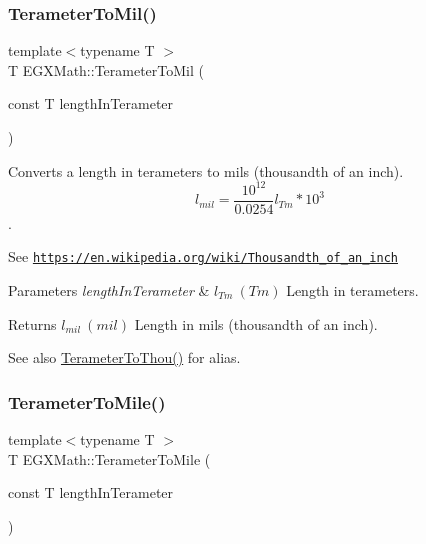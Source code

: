 \subsubsection{\texorpdfstring{Terameter\+To\+Mil()}{TerameterToMil()}}
{\footnotesize\ttfamily template$<$typename T $>$ \\
T E\+G\+X\+Math\+::\+Terameter\+To\+Mil (\begin{DoxyParamCaption}\item[{const T}]{length\+In\+Terameter }\end{DoxyParamCaption})}



Converts a length in terameters to mils (thousandth of an inch). \[ l_{mil}= \frac{10^{12}}{0.0254} l_{Tm} * 10^{3} \]. 

See \href{https://en.wikipedia.org/wiki/Thousandth_of_an_inch}{\tt https\+://en.\+wikipedia.\+org/wiki/\+Thousandth\+\_\+of\+\_\+an\+\_\+inch} 
\begin{DoxyParams}{Parameters}
{\em length\+In\+Terameter} & $ l_{Tm}\ (Tm)$ Length in terameters. \\
\hline
\end{DoxyParams}
\begin{DoxyReturn}{Returns}
$ l_{mil}\ (mil)$ Length in mils (thousandth of an inch). 
\end{DoxyReturn}
\begin{DoxySeeAlso}{See also}
\mbox{\hyperlink{group___e_g_x_math-_conversions-_length_conversions-_s_i-_terameter-_imperial_ga3e00f52eb5c96d53031f36d7003a0e5e}{Terameter\+To\+Thou()}} for alias. 
\end{DoxySeeAlso}
\mbox{\label{group___e_g_x_math-_conversions-_length_conversions-_s_i-_terameter-_imperial_ga51468f3ffd5925fb2cbb188d49b6aa60}} 
\subsubsection{\texorpdfstring{Terameter\+To\+Mile()}{TerameterToMile()}}
{\footnotesize\ttfamily template$<$typename T $>$ \\
T E\+G\+X\+Math\+::\+Terameter\+To\+Mile (\begin{DoxyParamCaption}\item[{const T}]{length\+In\+Terameter }\end{DoxyParamCaption})}



